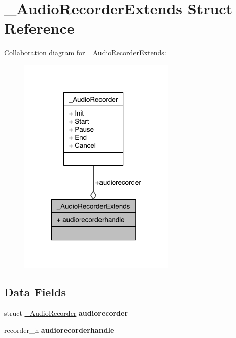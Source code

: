 \hypertarget{struct__AudioRecorderExtends}{\section{\-\_\-\-Audio\-Recorder\-Extends Struct Reference}
\label{struct__AudioRecorderExtends}
}


Collaboration diagram for \-\_\-\-Audio\-Recorder\-Extends\-:\nopagebreak
\begin{figure}[H]
\begin{center}
\leavevmode
\includegraphics[width=212pt]{d5/de1/struct__AudioRecorderExtends__coll__graph}
\end{center}
\end{figure}
\subsection*{Data Fields}
\begin{DoxyCompactItemize}
\item 
\hypertarget{struct__AudioRecorderExtends_ac9cc91a707e660fb31213e8be119c816}{struct \hyperlink{struct__AudioRecorder}{\-\_\-\-Audio\-Recorder} {\bfseries audiorecorder}}\label{struct__AudioRecorderExtends_ac9cc91a707e660fb31213e8be119c816}

\item 
\hypertarget{struct__AudioRecorderExtends_af08756e456b832eca1fd4a4d41bd75c2}{recorder\-\_\-h {\bfseries audiorecorderhandle}}\label{struct__AudioRecorderExtends_af08756e456b832eca1fd4a4d41bd75c2}

\end{DoxyCompactItemize}


